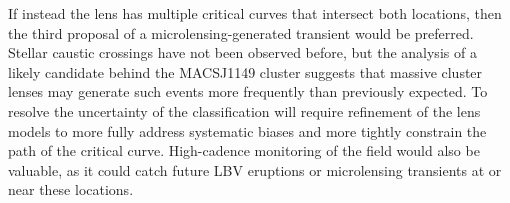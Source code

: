 If instead the  lens has multiple critical curves that
intersect both \spock locations, then the third proposal of a
microlensing-generated transient would be preferred.  Stellar caustic
crossings have not been observed before, but the analysis of a likely
candidate behind the MACSJ1149 cluster suggests that massive cluster
lenses may generate such events more frequently than previously
expected\citep{Kelly:2017, Diego:2017}. To resolve the uncertainty of
the \spock classification will require refinement of the lens models
to more fully address systematic biases and more tightly constrain the
path of the critical curve.  High-cadence monitoring of the 
field would also be valuable, as it could catch future LBV eruptions
or microlensing transients at or near these locations.
